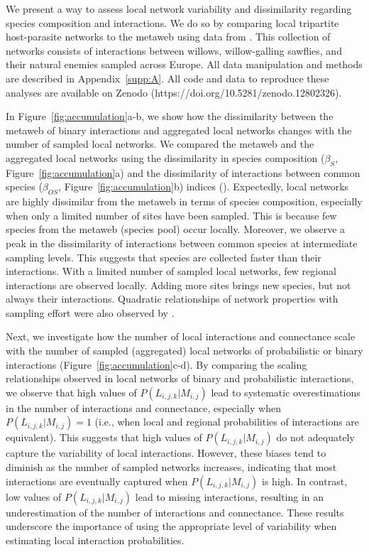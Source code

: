 \begin{box2.2}

We present a way to assess local network variability and dissimilarity regarding
species composition and interactions. We do so by comparing local tripartite
host-parasite networks to the metaweb using data from \cite{Kopelke2017Foodweb}.
This collection of networks consists of interactions between willows,
willow-galling sawflies, and their natural enemies sampled across Europe. All
data manipulation and methods are described in Appendix~\ref{supp:A}. All code
and data to reproduce these analyses are available on Zenodo
(https://doi.org/10.5281/zenodo.12802326).

In Figure~\ref{fig:accumulation}a-b, we show how the dissimilarity between the
metaweb of binary interactions and aggregated local networks changes with the
number of sampled local networks. We compared the metaweb and the aggregated
local networks using the dissimilarity in species composition ($\beta_{S}$,
Figure~\ref{fig:accumulation}a) and the dissimilarity of interactions between
common species ($\beta_{OS}$, Figure~\ref{fig:accumulation}b) indices
(\cite{Poisot2012Dissimilarity}). Expectedly, local networks are highly
dissimilar from the metaweb in terms of species composition, especially when
only a limited number of sites have been sampled. This is because few species
from the metaweb (species pool) occur locally. Moreover, we observe a peak in
the dissimilarity of interactions between common species at intermediate
sampling levels. This suggests that species are collected faster than their
interactions. With a limited number of sampled local networks, few regional
interactions are observed locally. Adding more sites brings new species, but not
always their interactions. Quadratic relationships of network properties with
sampling effort were also observed by \cite{McLeod2021Sampling}.

Next, we investigate how the number of local interactions and connectance
scale with the number of sampled (aggregated) local networks of probabilistic
or binary interactions (Figure~\ref{fig:accumulation}c-d). By comparing the scaling
relationships observed in local networks of binary and probabilistic
interactions, we observe that high values of $P(L_{i, j, k}|M_{i, j})$ lead to
systematic overestimations in the number of interactions and connectance,
especially when $P(L_{i, j, k}|M_{i, j}) = 1$ (i.e., when local and regional
probabilities of interactions are equivalent). This suggests that high values
of $P(L_{i, j, k}|M_{i, j})$ do not adequately capture the variability of
local interactions. However, these biases tend to diminish as the number of
sampled networks increases, indicating that most interactions are eventually
captured when $P(L_{i, j, k}|M_{i, j})$ is high. In contrast, low values of
$P(L_{i, j, k}|M_{i, j})$ lead to missing interactions, resulting in an
underestimation of the number of interactions and connectance. These results
underscore the importance of using the appropriate level of variability when
estimating local interaction probabilities.

\end{box2.2}

